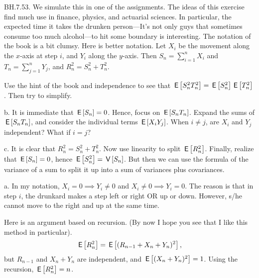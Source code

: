 \setcounter{theorem}{52}
\begin{exercise}
BH.7.53. We simulate this in one of the assignments.
The ideas of this exercise find much use in finance, physics, and actuarial sciences.
In particular, the expected time it takes the drunken person---It's not only guys that sometimes consume too much alcohol---to hit some boundary is interesting. The notation of the book is a bit clumsy. Here is better notation.
Let $X_i$ be the movement along the \(x\)-axis at step $i$, and $Y_i$ along the $y$-axis.
Then $S_n=\sum_{i=1}^n X_i$ and $T_n=\sum_{j=1}^n Y_{j}$, and $R_n^2= S_n^2+T_n^2$.
\begin{hint}
Use the hint of the book and independence to see that $\,\mathsf{E}\left[S_{n}^2 T_n^2\right] = \,\mathsf{E}\left[S_n^{2}\right] \,\mathsf{E}\left[T_n^{2}\right]$.
Then try to simplify.

b. It is immediate that $\,\mathsf{E}\left[S_n\right] = 0$.
Hence, focus on $\,\mathsf{E}\left[S_n T_n\right]$. Expand  the sums of $\,\mathsf{E}\left[S_n T_n\right]$, and consider the individual terms $\,\mathsf{E}\left[X_i Y_j\right]$. When $i\neq j$, are $X_i$ and $Y_{j}$  independent? What if  $i=j$?

c. It is clear that $R_n^2=S_n^2+T_{n}^2$. Now use linearity to split $\,\mathsf{E}\left[R^2_n\right]$. Finally, realize that $\,\mathsf{E}\left[S_n\right]=0$, hence $\,\mathsf{E}\left[S_n^2\right] = \,\mathsf{V}\left[S_n\right]$. But then we can use the formula of the variance of a sum to split it up into a sum of variances plus covariances.
\end{hint}

\begin{solution}
a. In my notation, $X_i=0 \implies Y_i\neq 0$ and $X_i\neq 0 \implies Y_i=0$. The reason is that in step $i$, the drunkard makes a step left or right OR up or down. However, s/he cannot move to the right and up at the same time.

Here is an argument based on recursion. (By now I hope you see that I like this method in particular).
\begin{align*}
\,\mathsf{E}\left[R_n^2\right] = \,\mathsf{E}\left[(R_{n-1} + X_n + Y_n)^{2}\right],
\end{align*}
but $R_{n-1}$ and $X_n+Y_n$ are independent, and $\,\mathsf{E}\left[(X_n + Y_n)^2\right] = 1$. Using the recursion, $\,\mathsf{E}\left[R^2_n\right] = n$.
\end{solution}
\end{exercise}


